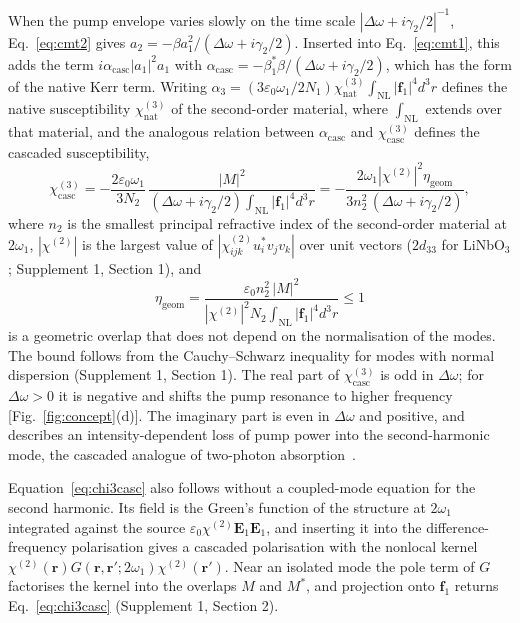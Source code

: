 \documentclass{optica-article}
\newcommand{\chitwo}{\chi^{(2)}}
\newcommand{\chicasc}{\chi^{(3)}_{\mathrm{casc}}}
\newcommand{\chinat}{\chi^{(3)}_{\mathrm{nat}}}
\newcommand{\Dom}{\Delta\omega}
\newcommand{\etag}{\eta_{\mathrm{geom}}}
\newcommand{\f}{\mathbf f}
\begin{document}
When the pump envelope varies slowly on the time scale
$|\Dom+i\gamma_2/2|^{-1}$, Eq.~\eqref{eq:cmt2} gives
$a_2=-\beta a_1^2/(\Dom+i\gamma_2/2)$.  Inserted into
Eq.~\eqref{eq:cmt1}, this adds the term
$i\alpha_{\mathrm{casc}}|a_1|^2a_1$ with
$\alpha_{\mathrm{casc}}=-\beta_1^*\beta/(\Dom+i\gamma_2/2)$, which has the
form of the native Kerr term.  Writing
$\alpha_3=(3\varepsilon_0\omega_1/2N_1)\chinat\int_{\mathrm{NL}}|\f_1|^4d^3r$
defines the native susceptibility $\chinat$ of the second-order material,
where $\int_{\mathrm{NL}}$ extends over that material, and the analogous
relation between $\alpha_{\mathrm{casc}}$ and $\chicasc$ defines the
cascaded susceptibility,
\begin{equation}
  \chicasc=-\frac{2\varepsilon_0\omega_1}{3N_2}\,
    \frac{|M|^2}{(\Dom+i\gamma_2/2)\int_{\mathrm{NL}}|\f_1|^4d^3r}
  =-\frac{2\omega_1|\chitwo|^2\etag}{3n_2^2\,(\Dom+i\gamma_2/2)} ,
  \label{eq:chi3casc}
\end{equation}
where $n_2$ is the smallest principal refractive index of the
second-order material at $2\omega_1$, $|\chitwo|$ is the largest value of
$|\chitwo_{ijk}u^*_iv_jv_k|$ over unit vectors ($2d_{33}$ for LiNbO$_3$;
Supplement 1, Section 1), and
\begin{equation}
  \etag=\frac{\varepsilon_0n_2^2\,|M|^2}{|\chitwo|^2N_2\int_{\mathrm{NL}}|\f_1|^4d^3r}\le1
  \label{eq:eta}
\end{equation}
is a geometric overlap that does not depend on the normalisation of the
modes.  The bound follows from the Cauchy--Schwarz inequality for modes
with normal dispersion (Supplement 1, Section 1).  The real part of
$\chicasc$ is odd in $\Dom$; for $\Dom>0$ it is negative and shifts the
pump resonance to higher frequency [Fig.~\ref{fig:concept}(d)].  The
imaginary part is even in $\Dom$ and positive, and describes an
intensity-dependent loss of pump power into the second-harmonic mode, the
cascaded analogue of two-photon absorption~\cite{gustin2025}.

Equation~\eqref{eq:chi3casc} also follows without a coupled-mode equation
for the second harmonic.  Its field is the Green's function of the
structure at $2\omega_1$ integrated against the source
$\varepsilon_0\chitwo\mathbf E_1\mathbf E_1$, and inserting it into the
difference-frequency polarisation gives a cascaded polarisation with the
nonlocal kernel $\chitwo(\mathbf r)G(\mathbf r,\mathbf r';2\omega_1)\chitwo(\mathbf r')$.
Near an isolated mode the pole term of
$G$~\cite{sauvan2013,lalanne2018} factorises the kernel into the overlaps
$M$ and $M^*$, and projection onto $\f_1$ returns
Eq.~\eqref{eq:chi3casc} (Supplement 1, Section 2).
\end{document}
